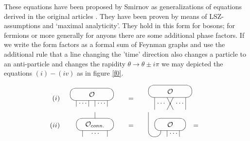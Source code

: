 \documentclass[a4paper,12pt]{article}
\begin{document}
These equations have been proposed by Smirnov \cite{Sm} as generalizations of
equations derived in the original articles \cite{KW,BKW,K2}. They have been
proven \cite{BFKZ} by means of LSZ-assumptions and `maximal analyticity'.
They hold in this form for bosons; for fermions or more generally for anyons
there are some additional phase factors. If we write the form factors as a
formal sum of Feynman graphs and use the additional rule that a line
changing the 'time' direction also changes a particle to an anti-particle
and changes the rapidity $\theta \rightarrow \theta \pm i\pi $ we may
depicted the equations $(i)-(iv)$ as in figure \ref{f0}. 
\begin{figure}[tbh]
\[
\begin{array}{rrcl}
(i) & 
\begin{array}{c}
\unitlength3.2mm\begin{picture}(7,3) \put(3.5,2){\oval(7,2)}
\put(3.5,2){\makebox(0,0){${\cal O}$}} \put(1,0){\line(0,1){1}}
\put(3,0){\line(0,1){1}} \put(4,0){\line(0,1){1}} \put(6,0){\line(0,1){1}}
\put(1.4,.5){$\dots$} \put(4.4,.5){$\dots$} \end{picture}
\end{array}
~~ & = & ~~ 
\begin{array}{c}
\unitlength3.2mm\begin{picture}(7,4) \put(3.5,3){\oval(7,2)}
\put(3.5,3){\makebox(0,0){${\cal O}$}} \put(1,0){\line(0,1){2}}
\put(3,0){\line(1,2){1}} \put(4,0){\line(-1,2){1}} \put(6,0){\line(0,1){2}}
\put(1.4,1){$\dots$} \put(4.4,1){$\dots$} \end{picture}
\end{array}
\\ 
(ii) & 
\begin{array}{c}
\unitlength3.2mm\begin{picture}(6,4) \put(3,2){\oval(6,2)[]}
\put(3,2){\makebox(0,0){${\cal O}_{conn.}$}} \put(1,0){\line(0,1){1}}
\put(2.4,0.5){$\dots$} \put(5,0){\line(0,1){1}} \put(3,3){\line(0,1){1}}
\end{picture}
\end{array}
~~ & = & ~~ 
\begin{array}{c}
\unitlength3.2mm\begin{picture}(6,4) \put(1,1){\oval(2,2)[b]}
\put(3.5,2){\oval(5,2)} \put(3.5,2){\makebox(0,0){${\cal O}$}}
\put(3,0){\line(0,1){1}} \put(5,0){\line(0,1){1}} \put(0,1){\line(0,1){3}}
\put(3.4,.5){$\dots$} \end{picture}
\end{array}
~=~ 
\begin{array}{c}

\end{array}
\end{array}\]
\end{figure}
\end{document}

